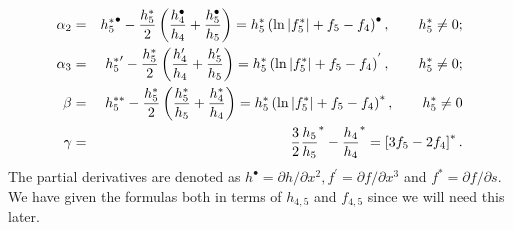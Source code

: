 \documentclass[a4paper,preprint,prabib,aps]{revtex4}
\begin{document}
\begin{eqnarray}
\alpha _{2} &=&{h_{5}^{\ast }}^{\bullet }-\frac{h_{5}^{\ast }}{2}\left(
\frac{h_{4}^{\bullet }}{h_{4}}+\frac{h_{5}^{\bullet }}{h_{5}}\right) ={%
h_{5}^{\ast }}\left( \ln |f_{5}^{\ast }|+f_{5}-f_{4}\right) ^{\bullet
},\qquad {h_{5}^{\ast }\neq 0;}  \label{alpha2} \\
\alpha _{3} &=&{h_{5}^{\ast }}^{\prime }-\frac{h_{5}^{\ast }}{2}\left( \frac{%
h_{4}^{\prime }}{h_{4}}+\frac{h_{5}^{\prime }}{h_{5}}\right) ={h_{5}^{\ast }}%
\left( \ln |f_{5}^{\ast }|+f_{5}-f_{4}\right) ^{^{\prime }},\qquad {%
h_{5}^{\ast }\neq 0;}  \label{alpha3} \\
\beta  &=&h_{5}^{\ast \ast }-\frac{h_{5}^{\ast }}{2}\left( \frac{h_{5}^{\ast
}}{h_{5}}+\frac{h_{4}^{\ast }}{h_{4}}\right) ={h_{5}^{\ast }}\left( \ln
|f_{5}^{\ast }|+f_{5}-f_{4}\right) ^{\ast },\qquad {h_{5}^{\ast }\neq 0}
\label{beta} \\
\gamma  &=&\frac{3}{2}\frac{h_{5}}{h_{5}}^{\ast }-\frac{h_{4}}{h_{4}}^{\ast
}=\left[ 3f_{5}-2f_{4}\right] ^{\ast }.  \label{gamma}
\end{eqnarray}
The partial derivatives are denoted as $h^{\bullet }=\partial h/\partial
x^{2},f^{\prime }=\partial f/\partial x^{3}$ and $f^{\ast }=\partial
f/\partial s.$ We have given the formulas both in terms of $h_{4,5}$ and
$f_{4,5}$ since we will need this later.
\end{document}
